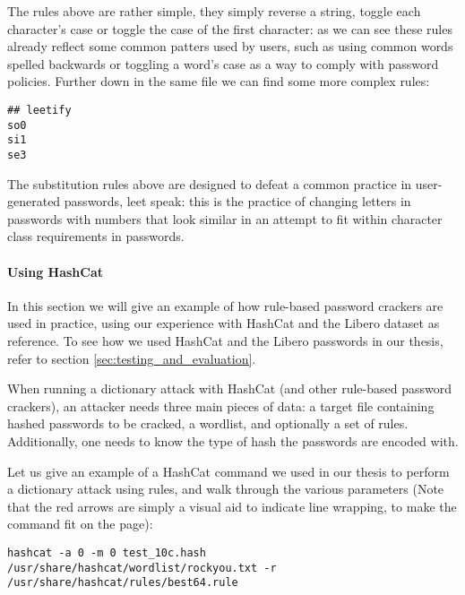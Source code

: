 The rules above are rather simple, they simply reverse a string, toggle each character's case or toggle the case of the first character: as we can see these rules already reflect some common patters used by users, such as using common words spelled backwards or toggling a word's case as a way to comply with password policies.
Further down in the same file we can find some more complex rules:
\begin{verbatim}
## leetify
so0
si1
se3
\end{verbatim}

The substitution rules above are designed to defeat a common practice in user-generated passwords, leet speak: this is the practice of changing letters in passwords with numbers that look similar in an attempt to fit within character class requirements in passwords. 

\paragraph{Using HashCat}
In this section we will give an example of how rule-based password crackers are used in practice, using our experience with HashCat and the Libero dataset as reference. To see how we used HashCat and the Libero passwords in our thesis, refer to section \ref{sec:testing_and_evaluation}.

When running a dictionary attack with HashCat (and other rule-based password crackers), an attacker needs three main pieces of data: a target file containing hashed passwords to be cracked, a wordlist, and optionally a set of rules.
Additionally, one needs to know the type of hash the passwords are encoded with.

Let us give an example of a HashCat command we used in our thesis to perform a dictionary attack using rules, and walk through the various parameters (Note that the red arrows are simply a visual aid to indicate line wrapping, to make the command fit on the page):

\begin{lstlisting}[breaklines=true,postbreak=\mbox{\textcolor{red}{$\hookrightarrow$}\space}]
hashcat -a 0 -m 0 test_10c.hash /usr/share/hashcat/wordlist/rockyou.txt -r /usr/share/hashcat/rules/best64.rule
\end{lstlisting}

